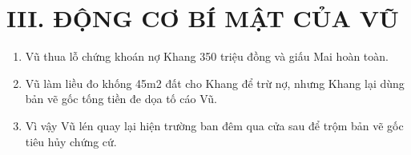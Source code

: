 \documentclass[12pt,a4paper]{article}
\begin{document}
\section*{III. ĐỘNG CƠ BÍ MẬT CỦA VŨ}
\begin{enumerate}
    \item Vũ thua lỗ chứng khoán nợ Khang 350 triệu đồng và giấu Mai hoàn toàn.
    \item Vũ làm liều đo khống 45m2 đất cho Khang để trừ nợ, nhưng Khang lại dùng bản vẽ gốc tống tiền đe dọa tố cáo Vũ.
    \item Vì vậy Vũ lén quay lại hiện trường ban đêm qua cửa sau để trộm bản vẽ gốc tiêu hủy chứng cứ.
\end{enumerate}
\end{document}

